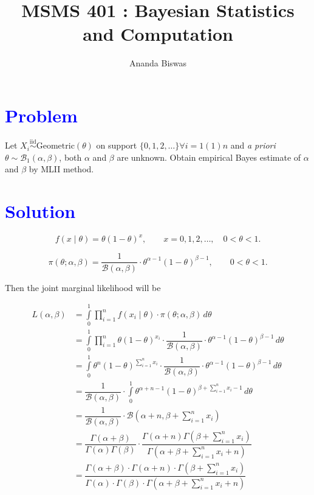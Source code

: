 \documentclass[12pt, a4paper]{article}
\title{MSMS 401 : Bayesian Statistics and Computation}
\author{{\fontsize{25}{20} \benyorithafont Ananda Biswas}}
\date{}
\begin{document}
\maketitle

\section*{\faArrowAltCircleRight[regular] \textcolor{blue}{Problem}}

Let $X_i \overset{\text{iid}}{\sim} \text{Geometric}(\theta)$ on support  $\{0,1,2,\ldots\} \forall i = 1(1)n $ and \textit{a priori} $\theta \sim \mathscr{B}_1(\alpha,\beta)$, both $\alpha$ and $\beta$ are unknown. Obtain empirical Bayes estimate of $\alpha$ and $\beta$ by MLII method.

\section*{\faArrowAltCircleRight[regular] \textcolor{blue}{Solution}}

$$f(x \mid \theta) = \theta(1-\theta)^x, \qquad x=0,1,2,\ldots,\quad 0<\theta<1.$$

$$\pi(\theta; \alpha, \beta) = \dfrac{1}{\mathcal{B}(\alpha,\beta)} \cdot \theta^{\alpha-1}(1-\theta)^{\beta-1}, \qquad 0<\theta<1.$$

\vspace{0.5cm}

Then the joint marginal likelihood will be

\begin{align*}
L(\alpha, \beta) &= \displaystyle{\int \limits_0^1 \prod \limits_{i=1}^n f(x_i \mid \theta) \cdot \pi(\theta; \alpha, \beta)} \, d\theta \\[0.5em]
&= \displaystyle{\int \limits_0^1 \prod \limits_{i=1}^n \theta(1-\theta)^{x_i} \cdot \dfrac{1}{\mathcal{B}(\alpha,\beta)} \cdot \theta^{\alpha-1}(1-\theta)^{\beta-1}} \, d\theta \\[0.5em]
&= \displaystyle{\int \limits_0^1 \theta^n (1-\theta)^{\sum \limits_{i=1}^n x_i} \cdot \dfrac{1}{\mathcal{B}(\alpha,\beta)} \cdot \theta^{\alpha-1}(1-\theta)^{\beta-1}} \, d\theta \\[0.5em]
&= \dfrac{1}{\mathcal{B}(\alpha,\beta)} \cdot \displaystyle{\int \limits_0^1 \theta^{\alpha + n - 1} (1 - \theta)^{\beta + \sum \limits_{i=1}^n x_i - 1}} \, d\theta \\[0.5em]
&= \dfrac{1}{\mathcal{B}(\alpha,\beta)} \cdot \mathcal{B}\left(\alpha + n,\beta + \sum \limits_{i=1}^n x_i \right) \\[0.7em]
&= \dfrac{\Gamma(\alpha+\beta)}{\Gamma(\alpha)\Gamma(\beta)} \cdot \dfrac{\Gamma(\alpha + n)\Gamma\left(\beta + \sum \limits_{i=1}^n x_i\right)}{\Gamma\left(\alpha + \beta + \sum \limits_{i=1}^n x_i + n\right)} \\[0.7em]
&= \dfrac{\Gamma(\alpha+\beta) \cdot \Gamma(\alpha+n) \cdot \Gamma\left(\beta + \sum \limits_{i=1}^n x_i\right)}{\Gamma(\alpha) \cdot \Gamma(\beta) \cdot \Gamma\left(\alpha + \beta + \sum \limits_{i=1}^n x_i + n\right)}
\end{align*}
\end{document}
